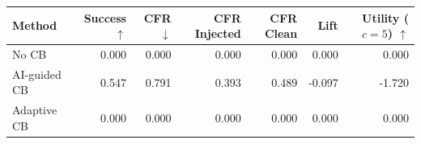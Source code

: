 \begin{tabular}{lrrrrrr}
\toprule
Method & Success $\uparrow$ & CFR $\downarrow$ & CFR Injected & CFR Clean & Lift & Utility ($c=5$) $\uparrow$ \\
\midrule
No CB & 0.000 & 0.000 & 0.000 & 0.000 & 0.000 & 0.000 \\
AI-guided CB & 0.547 & 0.791 & 0.393 & 0.489 & -0.097 & -1.720 \\
Adaptive CB & 0.000 & 0.000 & 0.000 & 0.000 & 0.000 & 0.000 \\
\bottomrule
\end{tabular}
